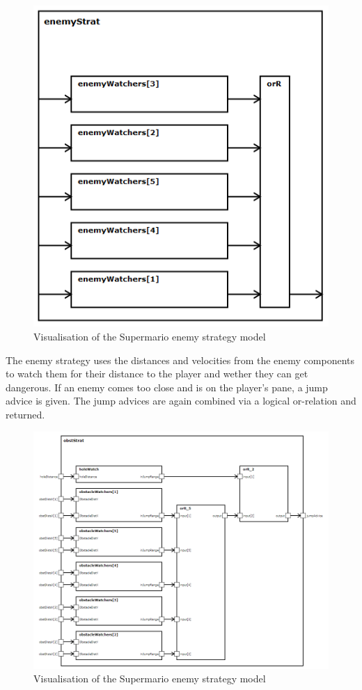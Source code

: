 \begin{figure}
	\centering
	\includegraphics[scale=0.4]{pictures/haller_enemystrategy.PNG}
	\caption{Visualisation of the Supermario enemy strategy model}
	\label{fig:marioEnemyStrategy}
\end{figure}

The enemy strategy uses the distances and velocities from the enemy components to watch them for their distance to the player and wether they can get dangerous. If an enemy comes too close and is on the player's pane, a jump advice is given. The jump advices are again combined via a logical or-relation and returned.

\begin{figure}
	\centering
	\includegraphics[scale=0.4]{pictures/haller_obstaclestrategy.PNG}
	\caption{Visualisation of the Supermario enemy strategy model}
	\label{fig:marioObstacleStrategy}
\end{figure}

